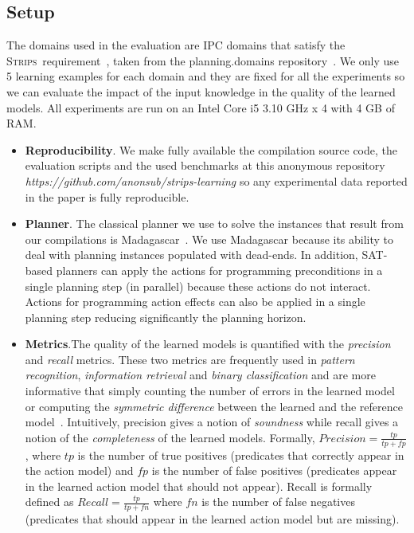 \documentclass[3p,times]{elsarticle}
\newcommand{\strips}{\textsc{Strips}}     %
\begin{document}
\subsection{Setup}
The domains used in the evaluation are IPC domains that satisfy the \strips\ requirement~\cite{fox2003pddl2}, taken from the {\sc planning.domains} repository~\cite{muise2016planning}. We only use 5 learning examples for each domain and they are fixed for all the experiments so we can evaluate the impact of the input knowledge in the quality of the learned models. All experiments are run on an Intel Core i5 3.10 GHz x 4 with 4 GB of RAM.
\begin{itemize}
\item {\bf Reproducibility}. We make fully available the compilation source code, the evaluation scripts and the used benchmarks at this anonymous repository {\em https://github.com/anonsub/strips-learning} so any experimental data reported in the paper is fully reproducible. 
\item {\bf Planner}. The classical planner we use to solve the instances that result from our compilations is {\sc Madagascar}~\cite{rintanen2014madagascar}. We use {\sc Madagascar} because its ability to deal with planning instances populated with dead-ends. In addition, SAT-based planners can apply the actions for programming preconditions in a single planning step (in parallel) because these actions do not interact. Actions for programming action effects can also be applied in a single planning step reducing significantly the planning horizon.
\item {\bf Metrics}.The quality of the learned models is quantified with the {\em precision} and {\em recall} metrics. These two metrics are frequently used in {\em pattern recognition}, {\em information retrieval} and {\em binary classification} and are more informative that simply counting the number of errors in the learned model or computing the {\em symmetric difference} between the learned and the reference model~\cite{davis2006relationship}. Intuitively, precision gives a notion of {\em soundness} while recall gives a notion of the {\em completeness} of the learned models. Formally, $Precision=\frac{tp}{tp+fp}$, where $tp$ is the number of true positives (predicates that correctly appear in the action model) and $fp$ is the number of false positives (predicates appear in the learned action model that should not appear). Recall is formally defined as $Recall=\frac{tp}{tp+fn}$ where $fn$ is the number of false negatives (predicates that should appear in the learned action model but are missing).
\end{itemize}
\end{document}
